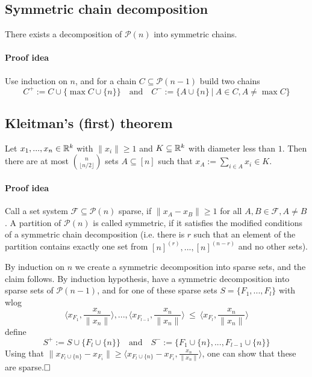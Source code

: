 \subsection{Symmetric chain decomposition}
There exists a decomposition of $\mathcal{P}(n)$ into symmetric chains.
\paragraph{Proof idea} Use induction on $n$, and for a chain $C \subseteq \mathcal{P}(n - 1)$ build two chains
\begin{equation*}
    C^+ := C \cup \{ \max C \cup \{ n \} \} \quad \text{and} \quad C^- := \{ A \cup \{n\} \ | \ A \in C, A \neq \max C \}
\end{equation*}

\subsection{Kleitman's (first) theorem}
Let $x_1, ..., x_n \in \mathbb{R}^k$ with $\| x_i \| \geq 1$ and $K \subseteq \mathbb{R}^k$ with diameter less than $1$.
Then there are at most ${n \choose \lfloor n/2 \rfloor}$ sets $A \subseteq [n]$ such that $x_A := \sum_{i \in A} x_i \in K$.
\paragraph{Proof idea} Call a set system $\mathcal{F} \subseteq \mathcal{P}(n)$ sparse, if $\| x_A - x_B \| \geq 1$ for all $A, B \in \mathcal{F}, A \neq B$.
A partition of $\mathcal{P}(n)$ is called symmetric, if it satisfies the modified conditions of a symmetric chain decomposition 
(i.e. there is $r$ such that an element of the partition contains exactly one set from $[n]^{(r)}, ..., [n]^{(n - r)}$ and no other sets).

By induction on $n$ we create a symmetric decomposition into sparse sets, and the claim follows.
By induction hypothesis, have a symmetric decomposition into sparse sets of $\mathcal{P}(n - 1)$, and for one of these sparse sets $S = \{ F_1, ..., F_l \}$ with wlog
\begin{equation*}
    \langle x_{F_1}, \frac {x_n} {\| x_n \|} \rangle, ..., \langle x_{F_{l - 1}}, \frac {x_n} {\| x_n \|} \rangle \ \leq \ \langle x_{F_l}, \frac {x_n} {\| x_n \|} \rangle
\end{equation*}
define
\begin{equation*}
    S^+ := S \cup \{ F_l \cup \{n\} \} \quad \text{and} \quad S^- := \{ F_1 \cup \{n\}, ..., F_{l - 1} \cup \{n\} \}
\end{equation*}
Using that $\| x_{F_l \cup \{n\}} - x_{F_i} \| \geq \langle x_{F_l \cup \{n\}} - x_{F_i}, \frac {x_n} {\| x_n \|} \rangle$, one can show that these are sparse.$\hfill\square$

